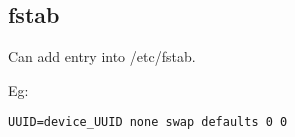 
\subsection{fstab}

Can add entry into /etc/fstab.

Eg:

\begin{verbatim}
UUID=device_UUID none swap defaults 0 0
\end{verbatim}



